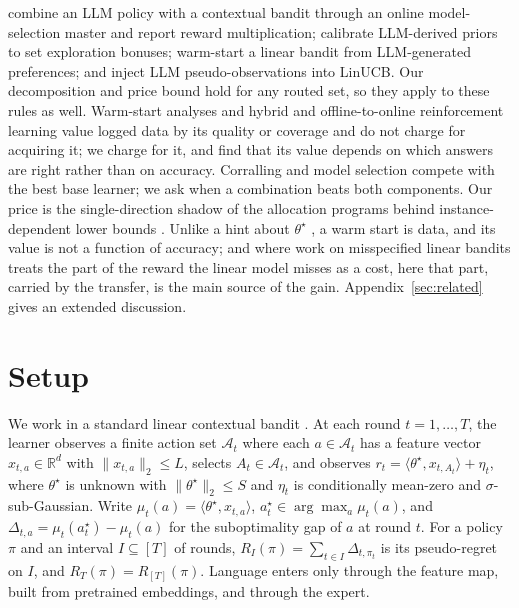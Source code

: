 \documentclass[anon]{alt2027} %
\begin{document}
\citet{chen2024llmdecision} combine an LLM policy with a contextual bandit
through an online model-selection master and report reward multiplication;
\citet{huangcontextual} calibrate LLM-derived priors to set exploration
bonuses; \citet{jumpstart2026} warm-start a linear bandit from LLM-generated
preferences; and \citet{calibgated2026} inject LLM pseudo-observations into
LinUCB. Our decomposition and price bound hold for any routed set, so they
apply to these rules as well. Warm-start analyses
\citep{bastani2021mostly,zhang2019warm} and hybrid and offline-to-online
reinforcement learning \citep{song2022hybrid,wagenmaker2023leveraging,hao2023leveraging}
value logged data by its quality or coverage and do not charge for acquiring
it; we charge for it, and find that its value depends on which answers are
right rather than on accuracy. Corralling and model selection
\citep{agarwal2017corralling,pacchiano2020model,marinov2021pareto} compete
with the best base learner; we ask when a combination beats both components.
Our price is the single-direction shadow of the allocation programs behind
instance-dependent lower bounds
\citep{graves1997asymptotically,lattimore2017end}. Unlike a hint about
$\theta^\star$ \citep{cutkosky2022leveraging}, a warm start is data, and its
value is not a function of accuracy; and where work on misspecified linear
bandits \citep{ghosh2017misspecified,lattimore2020learning,foster2020adapting}
treats the part of the reward the linear model misses as a cost, here that
part, carried by the transfer, is the main source of the gain.
Appendix~\ref{sec:related} gives an extended discussion.

\section{Setup}
\label{sec:setup}
\label{sec:preliminaries}

We work in a standard linear contextual bandit
\citep{abbasi2011improved,chu2011contextual,lattimore2020bandit}. At each round
$t=1,\dots,T$, the learner observes a finite action set $\mathcal A_t$ where
each $a\in\mathcal A_t$ has a feature vector $x_{t,a}\in\mathbb R^d$ with
$\|x_{t,a}\|_2\le L$, selects $A_t\in\mathcal A_t$, and observes
$r_t=\langle\theta^\star,x_{t,A_t}\rangle+\eta_t$, where $\theta^\star$ is
unknown with $\|\theta^\star\|_2\le S$ and $\eta_t$ is conditionally mean-zero
and $\sigma$-sub-Gaussian. Write $\mu_t(a)=\langle\theta^\star,x_{t,a}\rangle$,
$a_t^\star\in\arg\max_a\mu_t(a)$, and $\Delta_{t,a}=\mu_t(a_t^\star)-\mu_t(a)$
for the suboptimality gap of $a$ at round $t$. For a policy $\pi$ and an
interval $I\subseteq[T]$ of rounds, $R_I(\pi)=\sum_{t\in I}\Delta_{t,\pi_t}$ is
its pseudo-regret on $I$, and $R_T(\pi)=R_{[T]}(\pi)$. Language enters only through
the feature map, built from pretrained embeddings, and through the expert.
\end{document}
